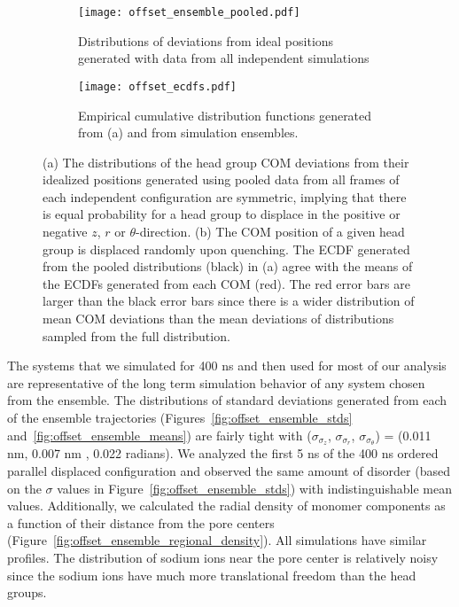   \begin{figure}[!htb]
  \centering
  \begin{subfigure}{\textwidth}
  \texttt{[image: offset\_ensemble\_pooled.pdf]}
  \caption{Distributions of deviations from ideal positions generated with data
  from all independent simulations}\label{fig:offset_ensemble_pooled}
  \end{subfigure}
  \begin{subfigure}{\textwidth}
  \texttt{[image: offset\_ecdfs.pdf]}
  \caption{Empirical cumulative distribution functions generated from (a) and
  from simulation ensembles.}\label{fig:offset_ecdfs}
  \end{subfigure}
  \caption{(a) The distributions of the head group COM deviations
  from their idealized positions generated using pooled data from all
  frames of each independent configuration are symmetric, implying that 
  there is equal probability for a head group to displace in the positive
  or negative $z$, $r$ or $\theta$-direction. (b) The COM position of a 
  given head group is displaced randomly upon quenching. The ECDF generated from
  the pooled distributions (black) in (a) agree with the means of the 
  ECDFs generated from each COM (red). The red error bars are larger than
  the black error bars since there is a wider distribution of mean COM
  deviations than the mean deviations of distributions sampled from the full
  distribution.}\label{fig:full_ensemble_distributions}
  \end{figure}
  
  The systems that we simulated for 400 ns and then used for most of our
  analysis are representative of the long term simulation behavior of any
  system chosen from the ensemble. The distributions of standard deviations 
  generated from each of the ensemble trajectories 
  (Figures~\ref{fig:offset_ensemble_stds} and~\ref{fig:offset_ensemble_means}) 
  are fairly tight with ($\sigma_{\sigma_z}$, $\sigma_{\sigma_r}$, $
  \sigma_{\sigma_\theta}$) = (0.011 nm, 0.007 nm , 0.022 radians).
  We analyzed the first 5 ns of the 400 ns ordered parallel displaced
  configuration and observed the same amount of disorder (based on the $\sigma$
  values in Figure~\ref{fig:offset_ensemble_stds}) with indistinguishable 
  mean values. Additionally, we calculated the radial density of monomer
  components as a function of their distance from the pore centers 
  (Figure~\ref{fig:offset_ensemble_regional_density}).
  All simulations have similar profiles. The distribution of sodium ions near the
  pore center is relatively noisy since the sodium ions have much more 
  translational freedom than the head groups. 
  

